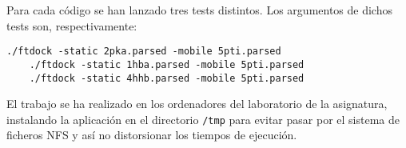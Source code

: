 Para cada c\'{o}digo se han lanzado tres tests distintos. Los argumentos de
dichos tests son, respectivamente:

\begin{lstlisting}[]
    ./ftdock -static 2pka.parsed -mobile 5pti.parsed
    ./ftdock -static 1hba.parsed -mobile 5pti.parsed
    ./ftdock -static 4hhb.parsed -mobile 5pti.parsed
\end{lstlisting}

El trabajo se ha realizado en los ordenadores del laboratorio de la asignatura,
instalando la aplicaci\'{o}n en el directorio \texttt{/tmp} para evitar pasar
por el sistema de ficheros NFS y as\'{i} no distorsionar los tiempos de
ejecuci\'{o}n.

